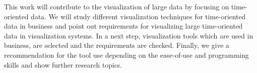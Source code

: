 \par
This work will contribute to the visualization of large data by focusing on time-oriented data. We will study different visualization techniques for time-oriented data in business and point out requirements for visualizing large time-oriented data in visualization systems. In a next step, visualization tools which are used in business, are selected and the requirements are checked. Finally, we give a recommendation for the tool use depending on the ease-of-use and programming skills and show further research topics.